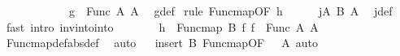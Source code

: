 \begin{isabellebody}
\ \ \ \ \isamarkupfalse%
\isanewline
\ \ \ \ \isamarkupfalse%
\ \isamarkupfalse%
\ {\isachardoublequoteopen}g\ {\isasymin}\ Func\ A{}\ A{}{\isachardoublequoteclose}\ \isamarkupfalse%
\ g{\isacharunderscore}{\kern0pt}def\ \isamarkupfalse%
{\isacharparenleft}{\kern0pt}rule\ Func{\isacharunderscore}{\kern0pt}map{\isacharbrackleft}{\kern0pt}OF\ h{\isacharbrackright}{\kern0pt}{\isacharparenright}{\kern0pt}\isanewline
\ \ \ \ \isamarkupfalse%
\ j{}A{}\ B{}\ A{}\ \isamarkupfalse%
\ j{}{\isacharunderscore}{\kern0pt}def\ \isamarkupfalse%
\ {\isacharparenleft}{\kern0pt}fast\ intro{\isacharcolon}{\kern0pt}\ inv{\isacharunderscore}{\kern0pt}into{\isacharunderscore}{\kern0pt}into{\isacharparenright}{\kern0pt}{\isacharplus}{\kern0pt}\isanewline
\ \ \ \ \isamarkupfalse%
\ \isamarkupfalse%
\ {\isachardoublequoteopen}h\ {\isasymin}\ Func{\isacharunderscore}{\kern0pt}map\ B{}\ f{}\ f{}\ {\isacharbackquote}{\kern0pt}\ Func\ A{}\ A{}{\isachardoublequoteclose}\isanewline
\ \ \ \ \isamarkupfalse%
\ Func{\isacharunderscore}{\kern0pt}map{\isacharunderscore}{\kern0pt}def{\isacharbrackleft}{\kern0pt}abs{\isacharunderscore}{\kern0pt}def{\isacharbrackright}{\kern0pt}\ \isamarkupfalse%
\ auto\isanewline
\ \ \isamarkupfalse%
{\isacharparenleft}{\kern0pt}insert\ B{}\ Func{\isacharunderscore}{\kern0pt}map{\isacharbrackleft}{\kern0pt}OF\ {\isacharunderscore}{\kern0pt}\ {\isacharunderscore}{\kern0pt}\ A{}{\isacharparenleft}{\kern0pt}{}{\isacharparenright}{\kern0pt}{\isacharbrackright}{\kern0pt}{\isacharcomma}{\kern0pt}\ auto{\isacharparenright}{\kern0pt}\isanewline
{}\isamarkupfalse%
%
\endisatagproof
{\isafoldproof}%
%
\isadelimproof
\isanewline
%
\endisadelimproof
%
\isadelimtheory
\isanewline
%
\endisadelimtheory
%
\isatagtheory
{}\isamarkupfalse%
%
\endisatagtheory
{\isafoldtheory}%
%
\isadelimtheory
%
\endisadelimtheory
%
\end{isabellebody}%
\endinput
